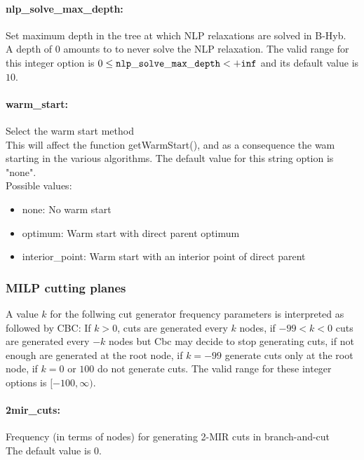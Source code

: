 \paragraph{nlp\_solve\_max\_depth:} Set maximum depth in the tree at which NLP relaxations are solved in B-Hyb. $\;$ \\
 A depth of 0 amounts to to never solve the NLP
relaxation. The valid range for this integer option is
$0 \le {\tt nlp\_solve\_max\_depth } <  {\tt +inf}$
and its default value is $10$.

\paragraph{warm\_start:} Select the warm start method $\;$ \\
 This will affect the function getWarmStart(), and
as a consequence the wam starting in the various
algorithms.
The default value for this string option is "none".
\\ 
Possible values:
\begin{itemize}
   \item none: No warm start
   \item optimum: Warm start with direct parent optimum
   \item interior\_point: Warm start with an interior point of direct
parent
\end{itemize}


\subsubsection{MILP cutting planes}
\label{sec:bonmin_options_for_MILP_cutting_planes}

A value $k$ for the follwing cut generator frequency parameters is interpreted as followed by CBC:
If $k > 0$, cuts are generated every $k$ nodes, if
$-99 < k < 0$ cuts are generated every $-k$ nodes but
Cbc may decide to stop generating cuts, if not
enough are generated at the root node, if $k=-99$
generate cuts only at the root node, if $k=0$ or
$100$ do not generate cuts.
The valid range for these integer options is $[-100, \infty)$.

\paragraph{2mir\_cuts:} Frequency (in terms of nodes) for generating 2-MIR cuts in branch-and-cut $\;$ \\
The default value is $0$.

